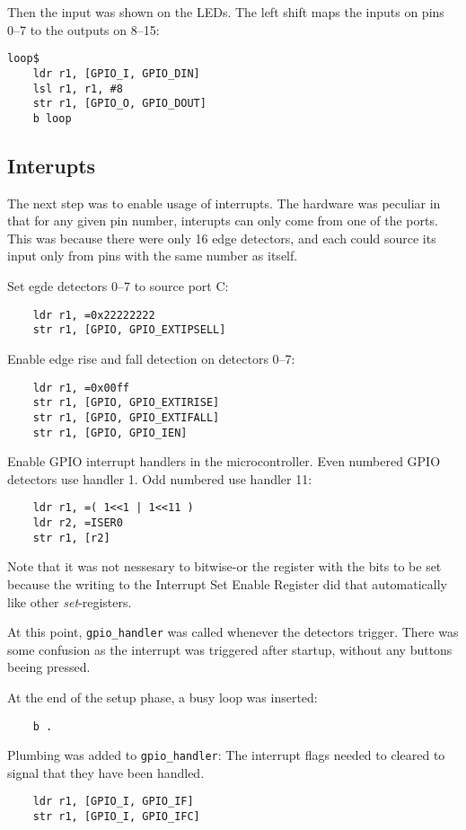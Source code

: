 Then the input was shown on the LEDs.
The left shift maps the inputs on pins 0--7 to the outputs on 8--15:
\begin{verbatim}
loop$
    ldr r1, [GPIO_I, GPIO_DIN]
    lsl r1, r1, #8
    str r1, [GPIO_O, GPIO_DOUT]
    b loop
\end{verbatim}


\subsection{Interupts}
The next step was to enable usage of interrupts.
The hardware was peculiar in that for any given pin number, interupts can only come from one of the ports.
This was because there were only 16 edge detectors, and each could source its input only from pins with the same number as itself.

Set egde detectors 0--7 to source port C:
\begin{verbatim}
    ldr r1, =0x22222222
    str r1, [GPIO, GPIO_EXTIPSELL]
\end{verbatim}

Enable edge rise and fall detection on detectors 0--7:
\begin{verbatim}
    ldr r1, =0x00ff
    str r1, [GPIO, GPIO_EXTIRISE]
    str r1, [GPIO, GPIO_EXTIFALL]
    str r1, [GPIO, GPIO_IEN]
\end{verbatim}

Enable GPIO interrupt handlers in the microcontroller.
Even numbered GPIO detectors use handler 1.
Odd numbered use handler 11:
\begin{verbatim}
    ldr r1, =( 1<<1 | 1<<11 )
    ldr r2, =ISER0
    str r1, [r2]
\end{verbatim}

Note that it was not nessesary to bitwise-or the register with the bits to be set because the writing to the Interrupt Set Enable Register did that automatically like other \emph{set}-registers.

At this point, \texttt{gpio\_handler} was called whenever the detectors trigger.
There was some confusion as the interrupt was triggered after startup, without any buttons beeing pressed.

At the end of the setup phase, a busy loop was inserted:
\begin{verbatim}
    b .
\end{verbatim}

Plumbing was added to \texttt{gpio\_handler}:
The interrupt flags needed to cleared to signal that they have been handled.
\begin{verbatim}
    ldr r1, [GPIO_I, GPIO_IF]
    str r1, [GPIO_I, GPIO_IFC]
\end{verbatim}


